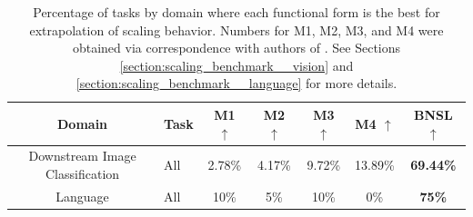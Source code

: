 \documentclass{article} %
\newcommand{\highlight}[1]{\colorbox{blue!10}{#1}}
\begin{document}
\begin{table}[hbt!]
    \centering
    \begin{tabular}{ |cH|c|c|c|c|c| } 
\hline
Domain & \hspace{.9cm}Task & M1 $\uparrow$ & M2 $\uparrow$ & M3 $\uparrow$ & M4 $\uparrow$ & BNSL $\uparrow$ \\
 \hline
 
Downstream Image Classification & All & 2.78\% & 4.17\% & 9.72\% & 13.89\% & \bfseries 69.44\%\\
 Language & All & 10\% & 5\% & 10\% & 0\% & \bfseries 75\%\\
 \hline
\end{tabular}
\vspace{-1.1mm}
    \caption{
    Percentage of tasks by domain where each functional form is the best for extrapolation of scaling behavior. Numbers for M1, M2, M3, and M4 were obtained via correspondence with authors of \cite{Alabdulmohsi2022revisiting}. See Sections \ref{section:scaling_benchmark__vision} and \ref{section:scaling_benchmark__language} for more details.
    }
    \label{table:scaling_laws_benchmark_dataset__summary}
\end{table}
\end{document}
